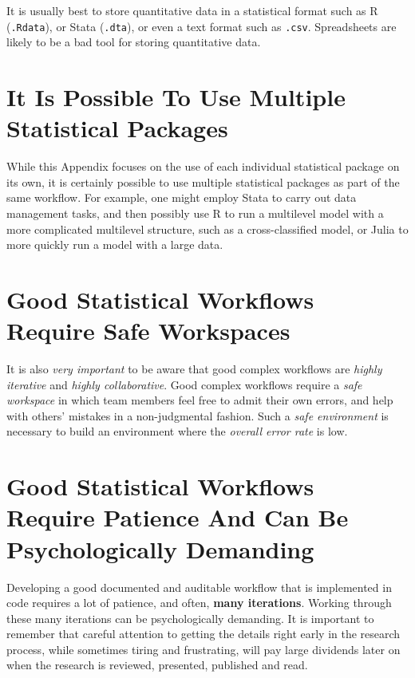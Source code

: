 \documentclass[
  letterpaper,
  DIV=11,
  numbers=noendperiod]{scrreprt}
\begin{document}
It is usually best to store quantitative data in a statistical format
such as R (\texttt{.Rdata}), or Stata (\texttt{.dta}), or even a text
format such as \texttt{.csv}. Spreadsheets are likely to be a bad tool
for storing quantitative data.

\section{It Is Possible To Use Multiple Statistical
Packages}\label{it-is-possible-to-use-multiple-statistical-packages}

While this Appendix focuses on the use of each individual statistical
package on its own, it is certainly possible to use multiple statistical
packages as part of the same workflow. For example, one might employ
Stata to carry out data management tasks, and then possibly use R to run
a multilevel model with a more complicated multilevel structure, such as
a cross-classified model, or Julia to more quickly run a model with a
large data.

\section{Good Statistical Workflows Require Safe
Workspaces}\label{good-statistical-workflows-require-safe-workspaces}

It is also \emph{very important} to be aware that good complex workflows
are \emph{highly iterative} and \emph{highly collaborative}. Good
complex workflows require a \emph{safe workspace} in which team members
feel free to admit their own errors, and help with others' mistakes in a
non-judgmental fashion. Such a \emph{safe environment} is necessary to
build an environment where the \emph{overall error rate} is low.

\section{Good Statistical Workflows Require Patience And Can Be
Psychologically
Demanding}\label{good-statistical-workflows-require-patience-and-can-be-psychologically-demanding}

Developing a good documented and auditable workflow that is implemented
in code requires a lot of patience, and often, \textbf{many iterations}.
Working through these many iterations can be psychologically demanding.
It is important to remember that careful attention to getting the
details right early in the research process, while sometimes tiring and
frustrating, will pay large dividends later on when the research is
reviewed, presented, published and read.
\end{document}
